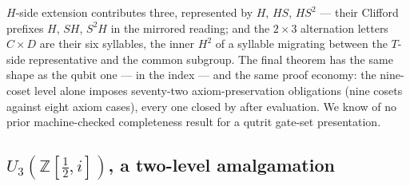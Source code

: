 $H$-side extension contributes three, represented by $H$, $HS$,
$HS^2$ --- their Clifford prefixes $H$, $SH$, $S^2H$ in the mirrored
reading; and the $2 \times 3$ alternation letters $C \times D$ are
their six syllables, the inner $H^2$ of a syllable migrating between
the $T$-side representative and the common subgroup. The final theorem has the same shape as
the qubit one ---  in the index ---
and the same proof economy: the nine-coset level alone imposes
seventy-two axiom-preservation obligations (nine cosets against eight
axiom cases), every one closed by  after evaluation.  We know of no prior machine-checked completeness
result for a qutrit gate-set presentation.

\subsection{$U_3(\mathbb{Z}[\tfrac12,i])$, a two-level amalgamation}

